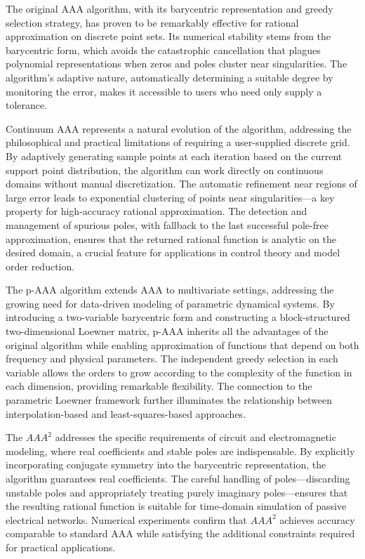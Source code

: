 \documentclass{article}
\begin{document}
The original AAA algorithm, with its barycentric representation and greedy selection strategy, has proven to be remarkably effective for rational approximation on discrete point sets. Its numerical stability stems from the barycentric form, which avoids the catastrophic cancellation that plagues polynomial representations when zeros and poles cluster near singularities. The algorithm's adaptive nature, automatically determining a suitable degree by monitoring the error, makes it accessible to users who need only supply a tolerance.

Continuum AAA represents a natural evolution of the algorithm, addressing the philosophical and practical limitations of requiring a user-supplied discrete grid. By adaptively generating sample points at each iteration based on the current support point distribution, the algorithm can work directly on continuous domains without manual discretization. The automatic refinement near regions of large error leads to exponential clustering of points near singularities—a key property for high-accuracy rational approximation. The detection and management of spurious poles, with fallback to the last successful pole-free approximation, ensures that the returned rational function is analytic on the desired domain, a crucial feature for applications in control theory and model order reduction.

The p-AAA algorithm extends AAA to multivariate settings, addressing the growing need for data-driven modeling of parametric dynamical systems. By introducing a two-variable barycentric form and constructing a block-structured two-dimensional Loewner matrix, p-AAA inherits all the advantages of the original algorithm while enabling approximation of functions that depend on both frequency and physical parameters. The independent greedy selection in each variable allows the orders to grow according to the complexity of the function in each dimension, providing remarkable flexibility. The connection to the parametric Loewner framework further illuminates the relationship between interpolation-based and least-squares-based approaches.

The $AAA^{2}$ addresses the specific requirements of circuit and electromagnetic modeling, where real coefficients and stable poles are indispensable. By explicitly incorporating conjugate symmetry into the barycentric representation, the algorithm guarantees real coefficients. The careful handling of poles—discarding unstable poles and appropriately treating purely imaginary poles—ensures that the resulting rational function is suitable for time-domain simulation of passive electrical networks. Numerical experiments confirm that $AAA^{2}$ achieves accuracy comparable to standard AAA while satisfying the additional constraints required for practical applications.
\end{document}
